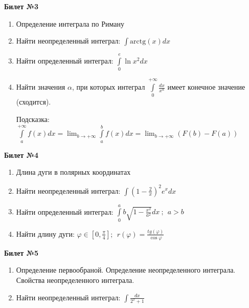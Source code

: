 \documentclass[a4paper, 12pt]{article}
\begin{document}
\begin{center}
	\textbf{Билет №3}
\end{center}
\begin{enumerate}
	\item Определение интеграла по Риману
	\item Найти неопределенный интеграл: $\displaystyle \int{\text{arctg}(x)dx}$
	\item Найти определенный интеграл: $\displaystyle \int\limits_{0}^{e}{\ln{x^2}dx}$
	\item Найти значения $\alpha$, при которых интеграл $\displaystyle \int\limits_{0}^{+\infty}{\frac{dx}{x^{\alpha}}}$ имеет конечное значение (сходится).
	
	Подсказка: $\displaystyle \int\limits_{a}^{+\infty}{f(x)dx} = \lim_{b\to+\infty}{\int\limits_{a}^{b}{f(x)dx}} = \lim_{b\to+\infty}{\left(F(b) - F(a)\right)} $
	
\end{enumerate}
\newpage
\begin{center}
	\textbf{Билет №4}
\end{center}
\begin{enumerate}
	\item Длина дуги в полярных координатах
	\item Найти неопределенный интеграл: $\displaystyle \int{\left(1-\frac{2}{x}\right)^2 e^xdx}$
	\item Найти определенный интеграл: $\displaystyle \int\limits_{0}^{a}{b\sqrt{1 - \frac{x^2}{a^2}}dx} \ ; \ \ a > b$
	\item Найти длину дуги: $\displaystyle \varphi \in \left[0, \frac{\pi}{4}\right];\ \  r(\varphi) = \displaystyle \frac{tg(\varphi)}{\cos{\varphi}}$
	
\end{enumerate}

\begin{center}
	\textbf{Билет №5}
\end{center}
\begin{enumerate}
	\item Определение первообраной. Определение неопределенного интеграла. Свойства неопределенного интеграла.
	\item Найти неопределенный интеграл: $\displaystyle \int{\frac{dx}{2^x + 1}}$
\end{enumerate}
\end{document}
